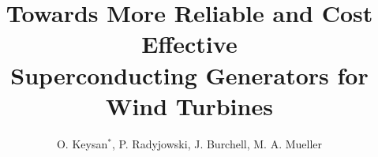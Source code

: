\documentclass[12pt]{IET02}
\begin{document}
\title{Towards More Reliable and Cost Effective \\Superconducting Generators for Wind Turbines}


\author{O. Keysan$^{*}$, P. Radyjowski, J. Burchell, M. A. Mueller}

\address{\textit{Institute for Energy Systems, University of Edinburgh, United Kingdom}\\
$^{*}$\textit{Email: o.keysan@ed.ac.uk}}



\twocolumn

\maketitle
\end{document}
